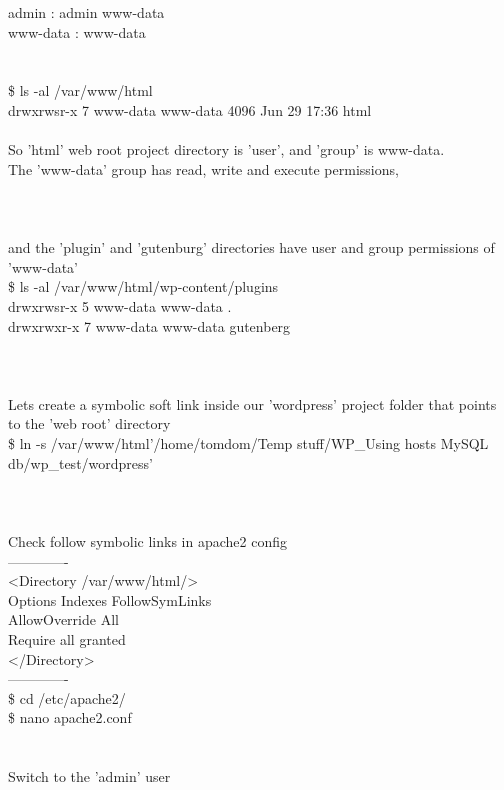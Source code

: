 \documentclass[10pt,a4paper]{article}
\begin{document}
{{{{{{{{{{{{{{{{{{{{{admin : admin www-data\\
www-data : www-data\\
\\
[(d)   user   group   other]\\
\$ ls -al /var/www/html}{\large \\
drwxrwsr-x  7   www-data    www-data    4096 Jun 29 17:36 html\\
\\
So 'html' web root project directory is 'user', and 'group' is www-data. \\
The 'www-data' group has read, write and execute permissions, \\
\\
\\
\\
and the 'plugin' and 'gutenburg' directories have user and group permissions of 'www-data'\\
\$ ls -al /var/www/html/wp-content/plugins}{\large \\
drwxrwsr-x 5    www-data    www-data  .\\
drwxrwxr-x 7    www-data    www-data   gutenberg\\
\\
\\
\\
Lets create a symbolic soft link inside our 'wordpress' project folder that points to the 'web root' directory\\
\$ ln -s /var/www/html}{\large  '/home/tomdom/Temp stuff/WP\_Using hosts MySQL db/wp\_test/wordpress'\\
\\
\\
\\
Check follow symbolic links in apache2 config\\
-------------\\
<Directory /var/www/html/>}{\large \\
        Options Indexes FollowSymLinks\\
        AllowOverride All\\
        Require all granted\\
</Directory>\\
-------------\\
\$ cd /etc/apache2/}{\large \\
\$ nano apache2.conf \\
\\
\\
Switch to the 'admin' user\\
}}}}}}}}}}}}}}}}}}}}}
\end{document}
